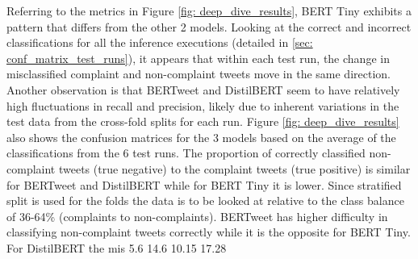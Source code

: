 Referring to the metrics in Figure \ref{fig: deep_dive_results}, BERT Tiny exhibits a pattern that differs from the other 2 models. Looking at the correct and incorrect classifications for all the inference executions (detailed in \ref{sec: conf_matrix_test_runs}), it appears that within each test run, the change in misclassified complaint and non-complaint tweets move in the same direction. Another observation is that BERTweet and DistilBERT seem to have relatively high fluctuations in recall and precision, likely due to inherent variations in the test data from the cross-fold splits for each run. Figure \ref{fig: deep_dive_results} also shows the confusion matrices for the 3 models based on the average of the classifications from the 6 test runs. The proportion of correctly classified non-complaint tweets (true negative) to the complaint tweets (true positive) is similar for BERTweet and DistilBERT while for BERT Tiny it is lower. Since stratified split is used for the folds the data is to be looked at relative to the class balance of 36-64\% (complaints to non-complaints). BERTweet has higher difficulty in classifying non-complaint tweets correctly while it is the opposite for BERT Tiny. For DistilBERT the mis
5.6 14.6
10.15 17.28


